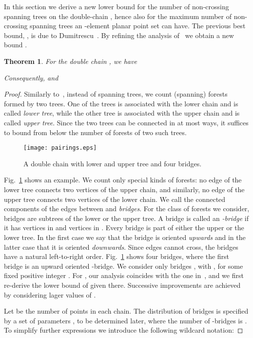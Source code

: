 \documentclass[11pt]{article}
\newtheorem{theorem}{Theorem}
\begin{document}
In this section we derive a new lower bound for the number of
non-crossing spanning trees on the double-chain ,
hence also for the maximum number of non-crossing spanning trees
an -element planar point set can have.
The previous best bound, , is due to Dumitrescu~\cite{D02}.
By refining the analysis of~\cite{D02} we obtain a new bound .
\begin{theorem}\label{thm:lbst}
For the double chain , we have

Consequently,  and 
\end{theorem}
\begin{proof}
Similarly to~\cite{D02}, instead of spanning trees, we count
(spanning) forests formed by two trees. One of the trees is
associated with the lower chain  and is called \emph{lower tree},
while the other tree is associated with the upper chain  and is
called \emph{upper tree}. Since the two trees can be connected in at
most  ways, it suffices to bound from below the number of forests of two
such trees.
\begin{figure}[htbp]
\centerline{\texttt{[image: pairings.eps]}}
\caption{A double chain with lower and upper tree and four bridges.}
\label{fig:pairings}
\end{figure}

Fig.~\ref{fig:pairings} shows an example. We count only special kinds of forests:
no edge of the lower tree connects two vertices of the upper chain, and similarly,
no edge of the upper tree connects two vertices of the lower chain.
We call the connected components of the edges between  and 
\emph{bridges}. For the class of forests we consider, bridges are
subtrees of the lower or the upper tree. A bridge is called an \emph{-bridge}
if it has  vertices in  and  vertices in .
Every bridge is part of either the upper or the lower tree.
In the first case we say that the bridge is oriented {\em upwards} and in the latter
case that it is oriented {\em downwards}. Since edges cannot cross, the bridges have
a natural left-to-right order. Fig.~\ref{fig:pairings} shows four
bridges, where the first bridge is an upward oriented
-bridge. We consider only bridges
, with , for some fixed positive integer .
For , our analysis coincides with the one in~\cite{D02}, and we first
re-derive the lower bound of  given there.
Successive improvements are achieved by considering lager values of .

Let  be the number of points in each chain. The distribution of
bridges is specified by a set of parameters , to be determined later,
where the number of -bridges is . To simplify
further expressions we introduce the following wildcard notation:


\end{proof}
\end{document}

